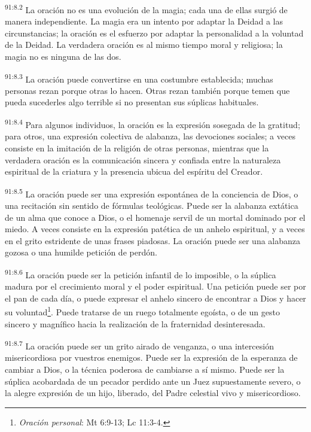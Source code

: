 \par
\textsuperscript{91:8.2} La oración no es una evolución de la magia; cada una de ellas surgió de manera independiente. La magia era un intento por adaptar la Deidad a las circunstancias; la oración es el esfuerzo por adaptar la personalidad a la voluntad de la Deidad. La verdadera oración es al mismo tiempo moral y religiosa; la magia no es ninguna de las dos.

\par
\textsuperscript{91:8.3} La oración puede convertirse en una costumbre establecida; muchas personas rezan porque otras lo hacen. Otras rezan también porque temen que pueda sucederles algo terrible si no presentan sus súplicas habituales.

\par
\textsuperscript{91:8.4} Para algunos individuos, la oración es la expresión sosegada de la gratitud; para otros, una expresión colectiva de alabanza, las devociones sociales; a veces consiste en la imitación de la religión de otras personas, mientras que la verdadera oración es la comunicación sincera y confiada entre la naturaleza espiritual de la criatura y la presencia ubicua del espíritu del Creador.

\par
\textsuperscript{91:8.5} La oración puede ser una expresión espontánea de la conciencia de Dios, o una recitación sin sentido de fórmulas teológicas. Puede ser la alabanza extática de un alma que conoce a Dios, o el homenaje servil de un mortal dominado por el miedo. A veces consiste en la expresión patética de un anhelo espiritual, y a veces en el grito estridente de unas frases piadosas. La oración puede ser una alabanza gozosa o una humilde petición de perdón.

\par
\textsuperscript{91:8.6} La oración puede ser la petición infantil de lo imposible, o la súplica madura por el crecimiento moral y el poder espiritual. Una petición puede ser por el pan de cada día, o puede expresar el anhelo sincero de encontrar a Dios y hacer su voluntad\footnote{\textit{Oración personal}: Mt 6:9-13; Lc 11:3-4.}. Puede tratarse de un ruego totalmente egoísta, o de un gesto sincero y magnífico hacia la realización de la fraternidad desinteresada.

\par
\textsuperscript{91:8.7} La oración puede ser un grito airado de venganza, o una intercesión misericordiosa por vuestros enemigos. Puede ser la expresión de la esperanza de cambiar a Dios, o la técnica poderosa de cambiarse a sí mismo. Puede ser la súplica acobardada de un pecador perdido ante un Juez supuestamente severo, o la alegre expresión de un hijo, liberado, del Padre celestial vivo y misericordioso.

